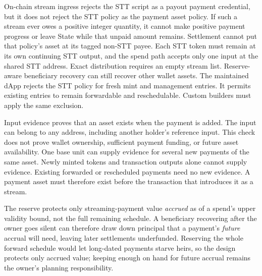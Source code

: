 \begin{description}[leftmargin=1.4em,style=nextline]
\item[STT-policy streaming assets.] On-chain stream ingress rejects the STT script as a payout payment credential, but it does not reject the STT policy as the payment asset policy. If such a stream ever owes a positive integer quantity, it cannot make positive payment progress or leave State while that unpaid amount remains. Settlement cannot put that policy's asset at its tagged non-STT payee. Each STT token must remain at its own continuing STT output, and the spend path accepts only one input at the shared STT address. Exact distribution requires an empty stream list. Reserve-aware beneficiary recovery can still recover other wallet assets. The maintained dApp rejects the STT policy for fresh mint and management entries. It permits existing entries to remain forwardable and reschedulable. Custom builders must apply the same exclusion.
\item[Streaming asset existence.] Input evidence proves that an asset exists when the payment is added. The input can belong to any address, including another holder's reference input. This check does not prove wallet ownership, sufficient payment funding, or future asset availability. One base unit can supply evidence for several new payments of the same asset. Newly minted tokens and transaction outputs alone cannot supply evidence. Existing forwarded or rescheduled payments need no new evidence. A payment asset must therefore exist before the transaction that introduces it as a stream.
\item[Streaming reserve is point-in-time.] The reserve protects only streaming-payment value \emph{accrued} as of a spend's upper validity bound, not the full remaining schedule. A beneficiary recovering after the owner goes silent can therefore draw down principal that a payment's \emph{future} accrual will need, leaving later settlements underfunded. Reserving the whole forward schedule would let long-dated payments starve heirs, so the design protects only accrued value; keeping enough on hand for future accrual remains the owner's planning responsibility.

\end{description}

